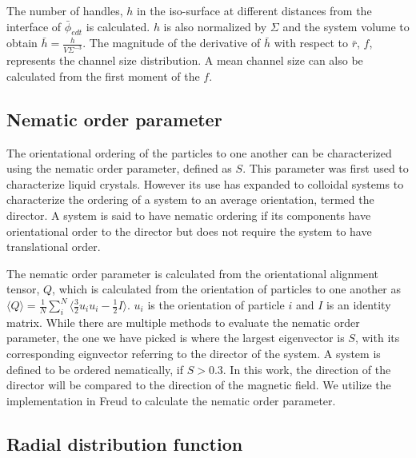 The number of handles, $h$
in the iso-surface at different distances from the interface of $\bar{\phi}_{edt}$ is calculated. $h$ is also normalized by $\Sigma$ and the system volume
to obtain $\bar{h} = \frac{h}{V\Sigma^{-3}}$. The magnitude of the derivative of $\bar{h}$ with respect to $\bar{r}$, $f$, represents the channel size distribution.
A mean channel size can also be calculated from the first moment of the $f$.

\subsection{Nematic order parameter}
\label{section:nematic_order_parameter}

The orientational ordering of the particles to one another can be characterized using the nematic order parameter, 
defined as $S$. This parameter was first used to characterize liquid crystals. However its use has expanded to colloidal 
systems to characterize the ordering of a system to an average orientation, termed the director. A system is said to have 
nematic ordering if its components have orientational order to the director but does not require the system to have 
translational order.

The nematic order parameter is calculated from the orientational alignment tensor, $Q$, which is calculated from the 
orientation of particles to one another as 
$\langle Q \rangle = \frac{1}{N} \sum_{i}^{N} \langle \frac{3}{2}u_i u_i - \frac{1}{2}I \rangle$. $u_i$ is the 
orientation of particle $i$ and $I$ is an identity matrix. \cite{veerman_phase_1992} While there are multiple 
methods to evaluate the nematic order parameter, the one we have picked is where the largest eigenvector is $S$, 
with its corresponding eignvector referring to the director of the system. \cite{veerman_phase_1992} 
A system is defined to be ordered nematically, 
if $S > 0.3$. In this work, the direction of the director will be compared to the direction of the magnetic 
field. We utilize the implementation in Freud to calculate the nematic order parameter.

\subsection{Radial distribution function}
\label{section:radial_distribution}

